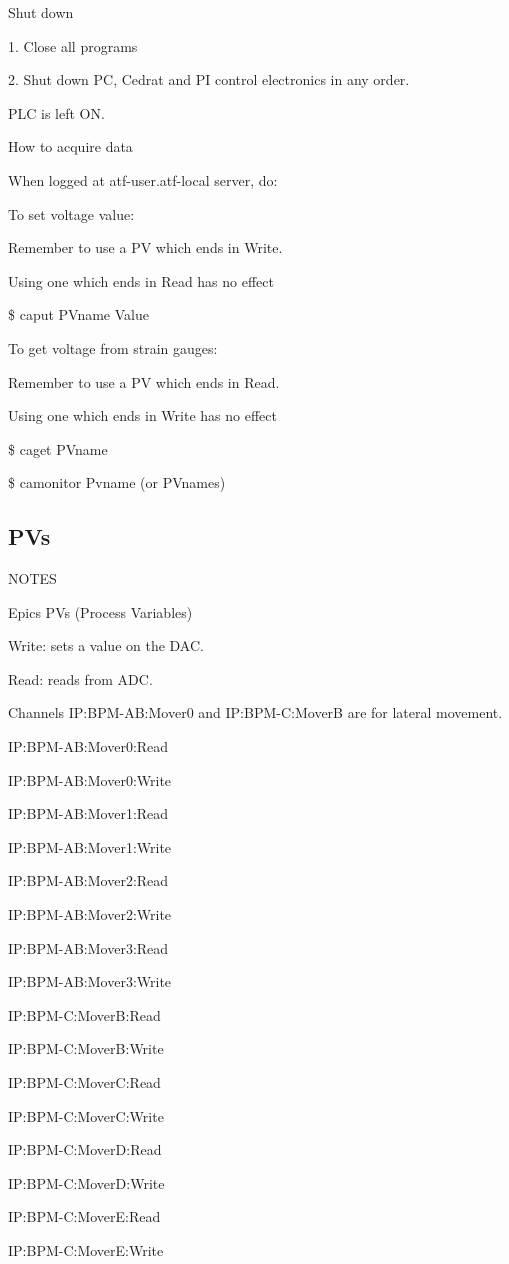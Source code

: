 \documentclass[a4paper,11pt]{book}
\begin{document}
Shut down\par
1. Close all programs\par
2. Shut down PC, Cedrat and PI control electronics in any order.\par
PLC is left ON.\par
How to acquire data\par
When logged at atf-user.atf-local server, do:\par
To set voltage value:\par
Remember to use a PV which ends in Write.\par
Using one which ends in Read has no effect\par
\$ caput PVname Value\par
To get voltage from strain gauges:\par
Remember to use a PV which ends in Read.\par
Using one which ends in Write has no effect\par
\$ caget PVname\par
\$ camonitor Pvname (or PVnames)\par

\subsection{PVs}
NOTES\par
Epics PVs (Process Variables)\par
Write: sets a value on the DAC.\par
Read: reads from ADC.\par
Channels IP:BPM-AB:Mover0 and IP:BPM-C:MoverB are for lateral movement.\par

IP:BPM-AB:Mover0:Read\par
IP:BPM-AB:Mover0:Write\par
IP:BPM-AB:Mover1:Read\par
IP:BPM-AB:Mover1:Write\par
IP:BPM-AB:Mover2:Read\par
IP:BPM-AB:Mover2:Write\par
IP:BPM-AB:Mover3:Read\par
IP:BPM-AB:Mover3:Write\par 

IP:BPM-C:MoverB:Read\par 
IP:BPM-C:MoverB:Write\par 
IP:BPM-C:MoverC:Read\par 
IP:BPM-C:MoverC:Write\par 
IP:BPM-C:MoverD:Read\par 
IP:BPM-C:MoverD:Write\par 
IP:BPM-C:MoverE:Read\par 
IP:BPM-C:MoverE:Write\par 
\end{document}

